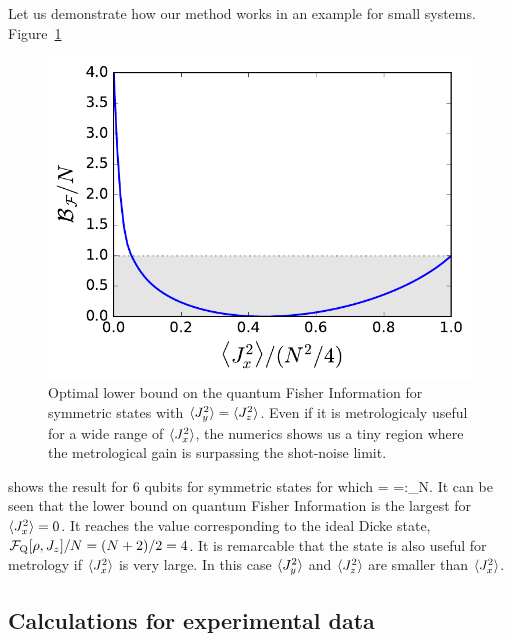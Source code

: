Let us demonstrate how our method works in an example for small systems.
Figure~\ref{fig:lt-symmetric-dicke-6-bound}
\begin{figure}[htp]
  \centering
  \includegraphics[scale=.65]{img/plots/LT_dicke_edge.pdf}
  \caption[6-particles optimal bound on BEC symmetry for the QFI when $\{\expect{J_x^2},\expect{J_y^2},\expect{J_z^2}\}$ are measured]{Optimal lower bound on the quantum Fisher Information for symmetric states with $\langle{J_y^2}\rangle=\langle{J_z^2}\rangle$. Even if it is metrologicaly useful for a wide range of $\langle{J_x^2}\rangle$, the numerics shows us a tiny region where the metrological gain is surpassing the shot-noise limit.}
  \label{fig:lt-symmetric-dicke-6-bound}
\end{figure}
shows the result for 6 qubits for symmetric states for which
\be
  \label{eq:lt-maximum-angular-momentum}
   = =:_N.
\ee
It can be seen that the lower bound on quantum Fisher Information is the largest for $\langle{J_x^2}\rangle=0$.
It reaches the value corresponding to the ideal Dicke state, $\mathcal{F}_{\textnormal{Q}}[{\textstyle \rho,J_z}]/N=(N+2)/2=4$.
It is remarcable that the state is also useful for metrology if $\langle{J_x^2}\rangle$ is very large.
In this case $\langle{J_y^2}\rangle$ and $\langle{J_z^2}\rangle$ are smaller than $\langle{J_x^2}\rangle$.

\subsection{Calculations for experimental data}

